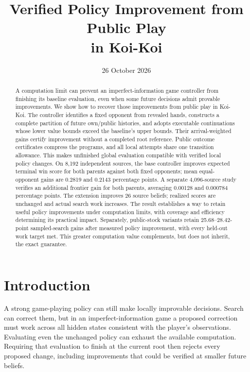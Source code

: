 \documentclass[11pt]{article}
\title{Verified Policy Improvement from Public Play\\
in Koi-Koi}
\author{}
\date{26 October 2026}
\begin{document}
\maketitle
\begin{abstract}
A computation limit can prevent an imperfect-information game controller
from finishing its baseline evaluation, even when some future decisions admit
provable improvements. We show how to recover those improvements from public
play in Koi-Koi. The controller identifies a fixed opponent from revealed
hands, constructs a complete partition of future own/public histories, and
adopts executable continuations whose lower value bounds exceed the baseline's
upper bounds. Their arrival-weighted gains certify improvement without a
completed root reference. Public outcome certificates compress the programs,
and all local attempts share one transition allowance. This makes unfinished
global evaluation compatible with verified local policy changes. On 8,192
independent sources, the base controller improves expected terminal win score
for both parents against both fixed opponents; mean equal-opponent gains are
0.2819 and 0.2143 percentage points. A separate 4,096-source study verifies an
additional frontier gain for both parents, averaging 0.00128 and 0.000784
percentage points. The extension improves 26 source beliefs; realized scores
are unchanged and actual search work increases. The result establishes a
way to retain useful policy improvements under computation limits, with
coverage and efficiency determining its practical impact. Separately,
public-stock variants retain 25.68--28.42-point sampled-search gains after
measured policy improvement, with every held-out work target met. This
greater computation value complements, but does not inherit, the exact guarantee.
\end{abstract}

\section{Introduction}
A strong game-playing policy can still make locally improvable decisions.
Search can correct them, but in an imperfect-information game a proposed
correction must work across all hidden states consistent with the player's
observations. Evaluating even the unchanged policy can exhaust the available
computation. Requiring that evaluation to finish at the current root then
rejects every proposed change, including improvements that could be verified
at smaller future beliefs.
\end{document}
